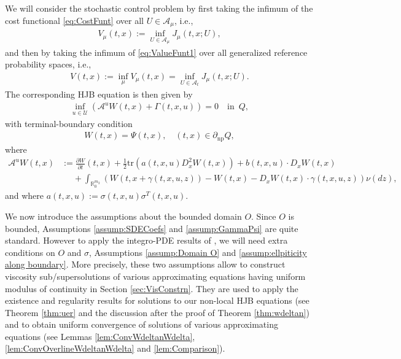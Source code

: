 \documentclass[amscd,amssymb,11pt]{article}
\numberwithin{theorem}{section}
\numberwithin{equation}{section}
\begin{document}
We will consider the stochastic control problem by first taking the infimum of the cost functional \eqref{eq:CostFunt} over all $U\in\mathcal{A}_{\mu}$, i.e.,
\begin{align}\label{eq:ValueFunt1}
V_{\mu}(t,x):=\inf_{U\in\mathcal{A}_{\mu}}J_{\mu}\left(t,x;U\right),
\end{align}
and then by taking the infimum of \eqref{eq:ValueFunt1} over all generalized reference probability spaces, i.e.,
\begin{align*}
V(t,x):=\inf_{\mu}V_{\mu}(t,x)=\inf_{U\in\mathcal{A}_t}J_{\mu}\left(t,x;U\right).
\end{align*}
The corresponding HJB equation is then given by
\begin{align}\label{eq:HJB}
\inf_{u\in\mathcal{U}}\left(\mathscr{A}^{u}W(t,x)+\Gamma(t,x,u)\right)=0\quad\text{in }\,Q,
\end{align}
with terminal-boundary condition
\begin{align}\label{eq:TermBoundCondHJB}
W(t,x)=\Psi(t,x),\quad (t,x)\in\partial_{\text{np}}Q,
\end{align}
where
\begin{align}
\mathscr{A}^{u}W(t,x)&:=\frac{\partial W}{\partial t}(t,x)+\frac{1}{2}\text{tr}\left(a(t,x,u)D_{x}^{2}W(t,x)\right)+b(t,x,u)\cdot D_{x}W(t,x)\nonumber\\
\label{eq:GenX} &\quad\,\,+\int_{\mathbb{R}^{m_{2}}_{0}}\left(W\!\left(t,x\!+\!\gamma(t,x,u,z)\right)-W(t,x)-D_{x}W(t,x)\cdot\gamma(t,x,u,z)\right)\nu(dz),
\end{align}
and where $a(t,x,u):=\sigma(t,x,u)\sigma^T(t,x,u)$.

We now introduce the assumptions about the bounded domain $O$. Since $O$ is bounded, Assumptions \ref{assump:SDECoefs} and \ref{assump:GammaPsi} are quite standard. However to apply the integro-PDE results of
\cite{Mou1:2016}, we will need extra conditions on $O$ and $\sigma$, Assumptions \ref{assump:Domain O}
and \ref{assump:ellpiticity along boundary}. More precisely, these two assumptions allow to construct viscosity sub/supersolutions 
of various approximating equations having uniform modulus of continuity in Section \ref{sec:VisConstrn}. They are
used to apply the existence and regularity results for solutions to our non-local HJB equations (see Theorem \ref{thm:uer} and the discussion after the proof of Theorem \ref{thm:wdeltan}) and to obtain uniform convergence of solutions of various approximating equations (see Lemmas \ref{lem:ConvWdeltanWdelta}, \ref{lem:ConvOverlineWdeltanWdelta} and \ref{lem:Comparison}). 
\end{document}
